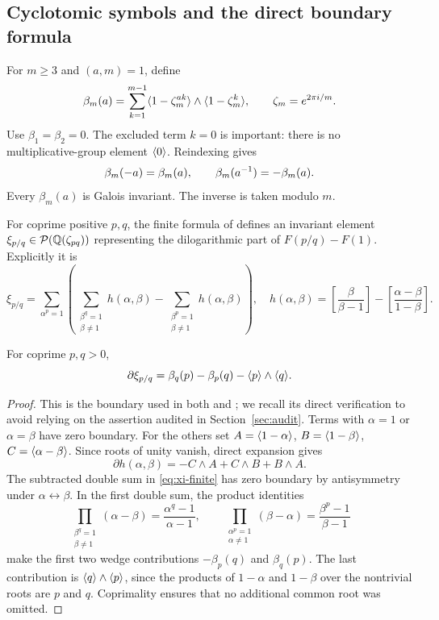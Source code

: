 \subsection{Cyclotomic symbols and the direct boundary formula}

For $m\ge3$ and $(a,m)=1$, define
\begin{equation}\label{eq:beta}
 \beta_m(a)=\sum_{k=1}^{m-1}
 \langle 1-\zeta_m^{ak}\rangle\wedge\langle 1-\zeta_m^k\rangle,
 \qquad \zeta_m=e^{2\pi i/m}.
\end{equation}
Use $\beta_1=\beta_2=0$. The excluded term $k=0$ is important: there is
no multiplicative-group element $\langle 0\rangle$. Reindexing gives
\begin{equation}\label{eq:symmetries}
 \beta_m(-a)=\beta_m(a),\qquad
 \beta_m(a^{-1})=-\beta_m(a).
\end{equation}
Every $\beta_m(a)$ is Galois invariant. The inverse is taken modulo $m$.

For coprime positive $p,q$, the finite formula of \cite[Theorem 3]{RZ}
defines an invariant element $\xi_{p/q}\in\mathcal P(\mathbb Q(\zeta_{pq}))$
representing the dilogarithmic part of $F(p/q)-F(1)$. Explicitly it is
\begin{equation}\label{eq:xi-finite}
 \xi_{p/q}=\sum_{\alpha^p=1}
 \left(\sum_{\substack{\beta^q=1\\\beta\ne1}}h(\alpha,\beta)
       -\sum_{\substack{\beta^p=1\\\beta\ne1}}h(\alpha,\beta)\right),
 \quad
 h(\alpha,\beta)=
 \left[\frac{\beta}{\beta-1}\right]
 -\left[\frac{\alpha-\beta}{1-\beta}\right].
\end{equation}

\begin{proposition}\label{prop:boundary}
For coprime $p,q>0$,
\begin{equation}\label{eq:boundary-F}
 \partial\xi_{p/q}
 =\beta_q(p)-\beta_p(q)-\langle p\rangle\wedge\langle q\rangle.
\end{equation}
\end{proposition}
\begin{proof}
This is the boundary used in both \cite{RZ} and \cite{Repo}; we recall its
direct verification to avoid relying on the assertion audited in
Section~\ref{sec:audit}. Terms with $\alpha=1$ or $\alpha=\beta$
have zero boundary. For the others set
$A=\langle 1-\alpha\rangle$, $B=\langle 1-\beta\rangle$, $C=\langle \alpha-\beta\rangle$.
Since roots of unity vanish, direct expansion gives
\[
 \partial h(\alpha,\beta)=-C\wedge A+C\wedge B+B\wedge A.
\]
The subtracted double sum in \eqref{eq:xi-finite} has zero boundary by
antisymmetry under $\alpha\leftrightarrow\beta$. In the first double
sum, the product identities
\[
 \prod_{\substack{\beta^q=1\\\beta\ne1}}(\alpha-\beta)
 =\frac{\alpha^q-1}{\alpha-1},\qquad
 \prod_{\substack{\alpha^p=1\\\alpha\ne1}}(\beta-\alpha)
 =\frac{\beta^p-1}{\beta-1}
\]
make the first two wedge contributions $-\beta_p(q)$ and $\beta_q(p)$.
The last contribution is $\langle q\rangle\wedge\langle p\rangle$, since the products of
$1-\alpha$ and $1-\beta$ over the nontrivial roots are $p$ and $q$.
Coprimality ensures that no additional common root was omitted.
\end{proof}

